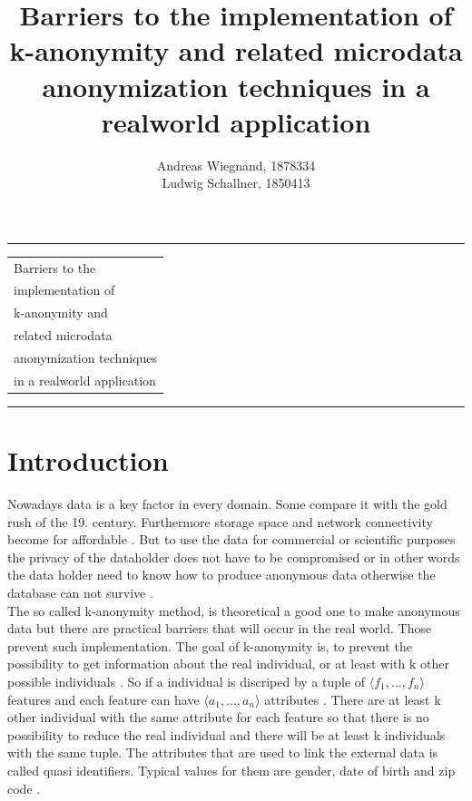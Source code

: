 \documentclass{llncs}
\begin{document}
\thispagestyle{empty}
\rule{\textwidth}{1pt}
\vspace{2pt}
\begin{flushright}
\Huge
\begin{tabular}{@{}l}
Barriers to the\\
implementation of\\
k-anonymity and\\
related microdata\\
anonymization techniques\\
in a realworld application\\[6pt]

\end{tabular}
\end{flushright}
\rule{\textwidth}{1pt}
\vfill
\title{Barriers to the implementation of k-anonymity and related microdata anonymization techniques in a realworld application}
\author{Andreas Wiegnand, 1878334\\
	Ludwig Schallner, 1850413}
\institute{}
\maketitle
%
\newpage
\section{Introduction}
%
Nowadays data is a key factor in every domain. Some compare it with the gold rush of the 19. century\cite{datarevo}. Furthermore storage space and network connectivity become for affordable \cite{sweeney2002k}. But to use the data for commercial or scientific purposes the privacy of the dataholder does not have to be compromised or in other words the data holder need to know how to produce anonymous data otherwise the database can not survive \cite{sweeney2002k}.\\

The so called k-anonymity method, is theoretical a good one to make anonymous data but there are practical barriers that will occur in the real world. Those prevent such implementation. The goal of k-anonymity is, to prevent the possibility to get information about the real individual, or at least with k other possible individuals \cite{sweeney2002k}. So if a individual is discriped by a tuple of \ensuremath{\langle f_1, ... ,f_n \rangle} features and each feature can have \ensuremath{\langle a_1,...,a_n \rangle} attributes \cite{sweeney2002k}. There are at least k other individual with the same attribute for each feature so that there is no possibility to reduce the real individual and there will be at least k individuals with the same tuple\cite{sweeney2002k}. The attributes that are used to link the external data is called quasi identifiers. Typical values for them are gender, date of birth and zip code \cite{ldiversity}. \\
\end{document}
